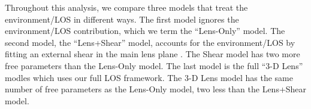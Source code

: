 Throughout this analysis, we compare three models that treat the environment/LOS in different ways. The first model ignores the environment/LOS contribution, which we term the ``Lens-Only'' model. The second model, the ``Lens+Shear'' model, accounts for the environment/LOS by fitting an external shear in the main lens plane \citep[e.g.,][]{Suyu13}. The Shear model has two more free parameters than the Lens-Only model. The last model is the full ``3-D Lens'' modles which uses our full LOS framework. The 3-D Lens model has the same number of free parameters as the Lens-Only model, two less than the Lens+Shear model.
  